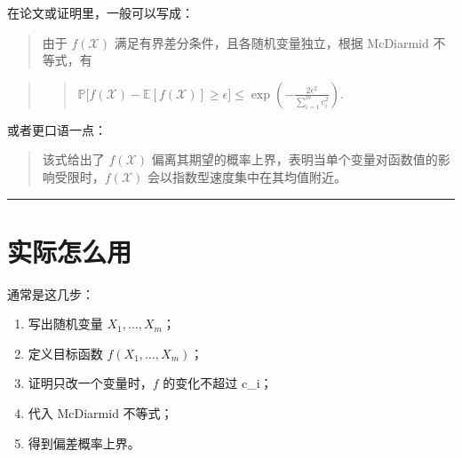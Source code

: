 在论文或证明里，一般可以写成：

\begin{quote}
由于 \(f(\mathcal X)\) 满足有界差分条件，且各随机变量独立，根据 McDiarmid 不等式，有
\end{quote}

\begin{quote}
\begin{quote}
\(\mathbb{P}\bigl[f(\mathcal X)-\mathbb E[f(\mathcal X)]\ge \epsilon\bigr] \le \exp\!\left(-\frac{2\epsilon^2}{\sum_{i=1}^m c_i^2}\right).\)
\end{quote}
\end{quote}

或者更口语一点：

\begin{quote}
该式给出了 \(f(\mathcal X)\) 偏离其期望的概率上界，表明当单个变量对函数值的影响受限时，\(f(\mathcal X)\) 会以指数型速度集中在其均值附近。
\end{quote}

\hrule

\section{实际怎么用}

通常是这几步：

\begin{enumerate}
  \item 写出随机变量 \(X_1,\dots,X_m\)；
  \item 定义目标函数 \(f(X_1,\dots,X_m)\)；
  \item 证明只改一个变量时，\(f\) 的变化不超过 c\_i；
  \item 代入 McDiarmid 不等式；
  \item 得到偏差概率上界。
\end{enumerate}
